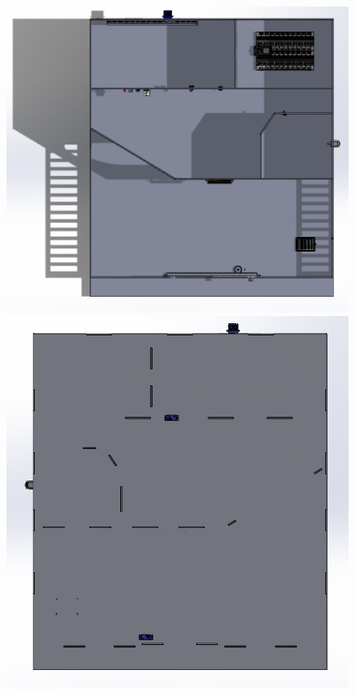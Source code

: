 \begin{figure}[htbp]
\begin{minipage}[t]{0.2\textwidth}
        \includegraphics[width=\textwidth]{figs/Smart_Home3.jpg}
    \end{minipage}
    \hfill
    \begin{minipage}[t]{0.2\textwidth}
        \centering
        \includegraphics[width=\textwidth]{figs/Smart_Home4.jpg}
    \end{minipage}
\end{figure}

